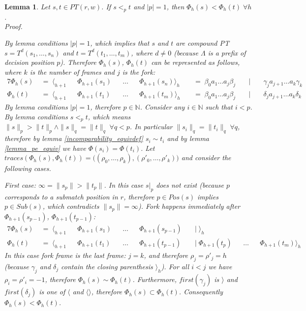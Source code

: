 \documentclass[AMA,STIX1COL]{WileyNJD-v2}
\newcommand{\Xl}{\langle}
\newcommand{\Xr}{\rangle}
\newcommand{\Xm}{\langle\!\rangle}
\newcommand{\YN}{\mathbb{N}}
\newtheorem{XLem}{Lemma}
\begin{document}
    \begin{XLem}\label{lemma_pe_less_1}
    Let $s, t \in PT(r, w)$.
    If $s <_p t$ and $|p| = 1$, then $\Phi_{h}(s) < \Phi_{h}(t) \; \forall h$.
    \\
    Proof.

    By lemma conditions $|p| = 1$, which implies that $s$ and $t$ are compound PT
    $s = T^{d} (s_1, \dots, s_n)$ and 
    $t = T^{d} (t_1, \dots, t_m)$, where
    $d \neq 0$
    (because $\Lambda$ is a prefix of decision position $p$).
    Therefore $\Phi_{h}(s)$, $\Phi_{h}(t)$ can be represented as follows,
    where $k$ is the number of frames and $j$ is the fork:
    \begin{alignat*}{7}
        \Phi_{h}(s) &\;=\; \Xl_{h+1} &&\Phi_{h+1}(s_1) &&\dots &&\Phi_{h+1}(s_n) \Xr_h
            &&\;=\; \beta_0 a_1 \dots a_j \beta_j &&\;\big|\; && \gamma_j a_{j + 1} \dots a_k \gamma_k \\[-0.5em]
        \Phi_{h}(t) &\;=\; \Xl_{h+1} &&\Phi_{h+1}(t_1) &&\dots &&\Phi_{h+1}(t_m) \Xr_h
            &&\;=\; \beta_0 a_1 \dots a_j \beta_j &&\;\big|\; && \delta_j a_{j + 1} \dots a_k \delta_k
    \end{alignat*}
%
    By lemma conditions $|p| = 1$, therefore $p \in \YN$.
    Consider any $i \in \YN$ such that $i < p$.
    By lemma conditions $s <_p t$, which means
    $\|s\|_p > \|t\|_p \wedge \|s\|_q = \|t\|_q \;\forall q < p$.
    In particular $\|s_i\|_q = \|t_i\|_q \;\forall q$,
    therefore by lemma \ref{incomparability_equivdef} $s_i \sim t_i$
    and by lemma \ref{lemma_pe_equiv} we have $\Phi(s_i) = \Phi(t_i)$.
    Let $traces (\Phi_{h}(s), \Phi_{h}(t)) = \big( (\rho_0, \dots, \rho_k), (\rho'_0, \dots, \rho'_k) \big)$
    and consider the following cases.

    \medskip

    First case:
    $\infty = \|s_p\| > \|t_p\|$.
    In this case $s|_p$ does not exist
    (because $p$ corresponds to a submatch position in $r$,
    therefore $p \in Pos(s)$ implies $p \in Sub(s)$,
    which contradicts $\|s_p\| = \infty$).
    Fork happens immediately after $\Phi_{h+1}(s_{p-1})$, $\Phi_{h+1}(t_{p-1})$:
    \begin{alignat*}{7}
        \Phi_{h}(s) &\;=\; \Xl_{h+1} &&\Phi_{h+1}(s_1) &&\dots &&\Phi_{h+1}(s_{p-1})
            &&\;\big|\; \Xr_{h}         &&      && \\[-0.5em]
        \Phi_{h}(t) &\;=\; \Xl_{h+1} &&\Phi_{h+1}(t_1) &&\dots &&\Phi_{h+1}(t_{p-1})
            &&\;\big|\; \Phi_{h+1}(t_p) &&\dots &&\Phi_{h+1}(t_m) \Xr_{h}
    \end{alignat*}
    In this case fork frame is the last frame: $j = k$, and therefore $\rho_j = \rho'_j = h$
    (because $\gamma_j$ and $\delta_j$ contain the closing parenthesis $\Xr_{h}$).
    For all $i < j$ we have $\rho_i = \rho'_i = -1$, therefore $\Phi_{h}(s) \sim \Phi_{h}(t)$.
    Furthermore, $first(\gamma_j)$ is $\Xr$ and $first(\delta_j)$ is one of $\Xl$ and $\Xm$,
    therefore $\Phi_{h}(s) \subset \Phi_{h}(t)$.
    Consequently $\Phi_{h}(s) < \Phi_{h}(t)$.


\end{XLem}
\end{document}

